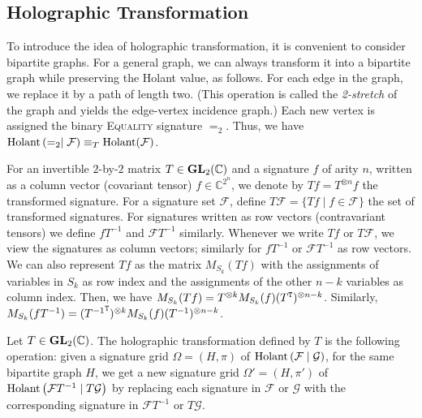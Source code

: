 
\subsection{Holographic Transformation}
To introduce the idea of holographic transformation,
it is convenient to consider bipartite graphs.
For a general graph,
we can always transform it into a bipartite graph while preserving the Holant value,
as follows.
For each edge in the graph,
we replace it by a path of length two.
(This operation is called the \emph{2-stretch} of the graph and yields the edge-vertex incidence graph.)
Each new vertex is assigned the binary \textsc{Equality} signature $=_2$. Thus, we have $\operatorname{Holant}\left(=_2\mid \mathcal{F}\right)\equiv_T \operatorname{Holant}(\mathcal{F})$.


For an invertible $2$-by-$2$ matrix $T \in {\bf GL}_2({\mathbb{C}})$
 and a signature $f$ of arity $n$, written as
a column vector (covariant tensor) $f \in \mathbb{C}^{2^n}$, we denote by
$Tf = T^{\otimes n} f$ the transformed signature.
  For a signature set $\mathcal{F}$,
define $T\mathcal{F} = \{T f \mid  f \in \mathcal{F}\}$ the set of
transformed signatures.
For signatures written as
 row vectors (contravariant tensors) we define
$f T^{-1}$ and  $\mathcal{F} T^{-1}$ similarly.
Whenever we write $T f$ or $T \mathcal{F}$,
we view the signatures as column vectors;
similarly for $f T^{-1}$ or $\mathcal{F} T^{-1}$ as row vectors.
We can also represent $Tf$ as the matrix $M_{S_k}(Tf)$ with the assignments of variables in $S_k$ as row index and the assignments of the other $n-k$ variables as column index. 
Then,  we  have $M_{S_k}(Tf)=T^{\otimes k}M_{S_k}(f)(T^{\tt T})^{\otimes n-k}$. Similarly, $M_{S_k}(fT^{-1})=({T^{-1}}^{\tt T})^{\otimes k}M_{S_k}(f)(T^{-1})^{\otimes n-k}$.

Let $T \in {\bf GL}_2({\mathbb{C}})$.
The holographic transformation defined by $T$ is the following operation:
given a signature grid $\Omega = (H, \pi)$ of $\operatorname{Holant}\left(\mathcal{F}\mid \mathcal{G}\right)$,
for the same bipartite graph $H$,
we get a new signature grid $\Omega' = (H, \pi')$ of $\operatorname{Holant}\left(\mathcal{F} T^{-1}\mid T \mathcal{G}\right)$ by replacing each signature in
$\mathcal{F}$ or $\mathcal{G}$ with the corresponding signature in $\mathcal{F} T^{-1}$ or $T \mathcal{G}$.

